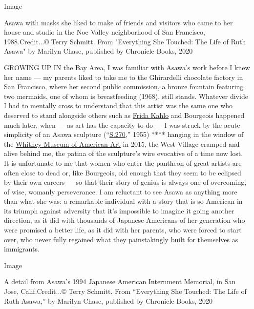 Image

Asawa with masks she liked to make of friends and visitors who came to
her house and studio in the Noe Valley neighborhood of San Francisco,
1988.Credit...© Terry Schmitt. From "Everything She Touched: The Life of
Ruth Asawa" by Marilyn Chase, published by Chronicle Books, 2020

GROWING UP IN the Bay Area, I was familiar with Asawa's work before I
knew her name --- my parents liked to take me to the Ghirardelli
chocolate factory in San Francisco, where her second public commission,
a bronze fountain featuring two mermaids, one of whom is breastfeeding
(1968), still stands. Whatever divide I had to mentally cross to
understand that this artist was the same one who deserved to stand
alongside others such as
\href{https://www.nytimes.com/topic/person/frida-kahlo}{Frida Kahlo} and
Bourgeois happened much later, when --- as art has the capacity to do
--- I was struck by the acute simplicity of an Asawa sculpture
(``\href{https://whitney.org/collection/works/2260}{S.270},'' 1955) ****
hanging in the window of the
\href{https://www.nytimes.com/topic/organization/whitney-museum-of-american-art}{Whitney
Museum of American Art} in 2015, the West Village cramped and alive
behind me, the patina of the sculpture's wire evocative of a time now
lost. It is unfortunate to me that women who enter the pantheon of great
artists are often close to dead or, like Bourgeois, old enough that they
seem to be eclipsed by their own careers --- so that their story of
genius is always one of overcoming, of wise, womanly perseverance. I am
reluctant to see Asawa as anything more than what she was: a remarkable
individual with a story that is so American in its triumph against
adversity that it's impossible to imagine it going another direction, as
it did with thousands of Japanese-Americans of her generation who were
promised a better life, as it did with her parents, who were forced to
start over, who never fully regained what they painstakingly built for
themselves as immigrants.

Image

A detail from Asawa's 1994 Japanese American Internment Memorial, in San
Jose, Calif.Credit...© Terry Schmitt. From ``Everything She Touched: The
Life of Ruth Asawa,'' by Marilyn Chase, published by Chronicle Books,
2020

